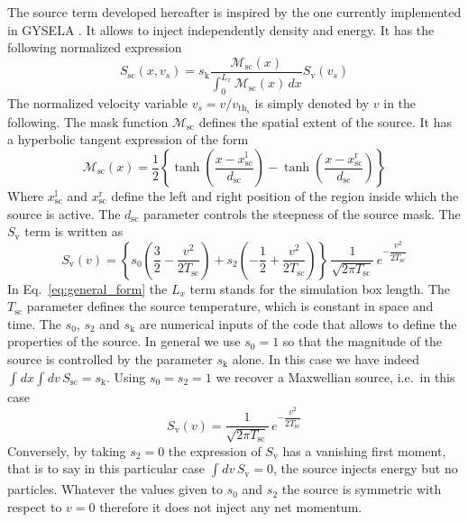 \documentclass[11pt]{article}
\begin{document}
The source term developed hereafter is inspired by the one currently implemented in GYSELA \cite[Appendix A]{Sarazin_2011}. It allows to inject independently density and energy. It has the following normalized expression
%
\begin{equation}\label{eq:general_form}
   S_\mathrm{sc}(x, v_s) = s_\mathrm{k} \dfrac{\mathcal{M}_\mathrm{sc}(x)}{\int_{0}^{L_x} \mathcal{M}_\mathrm{sc}(x) \, dx} S_\mathrm{v}(v_s) 
\end{equation}
%
The normalized velocity variable $v_s = v/v_{\mathrm{th}_s}$ is simply denoted by $v$ in the following. The mask function $\mathcal{M}_\mathrm{sc}$ defines the spatial extent of the source. It has a hyperbolic tangent expression of the form 
%
\begin{equation*}
  \mathcal{M}_\mathrm{sc}(x)  = \dfrac{1}{2}\left\{ \operatorname{tanh}{\left(\dfrac{x-x_\mathrm{sc}^\mathrm{l}}{d_\mathrm{sc}}\right)} - \operatorname{tanh}{\left(\dfrac{x-x_\mathrm{sc}^\mathrm{r}}{d_\mathrm{sc}}\right)}  \right\} 
\end{equation*}
%
Where $x_\mathrm{sc}^\mathrm{l}$ and $x_\mathrm{sc}^\mathrm{r}$ define the left and right position of the region inside which the source is active. The $d_\mathrm{sc}$ parameter controls the steepness of the source mask. The  $S_\mathrm{v}$ term is written as
%
\begin{equation}\label{eq:sv_expression}
  S_\mathrm{v}(v) = \left\{ s_0\left( \dfrac{3}{2} - \dfrac{v^2}{2 T_\mathrm{sc}} \right) + s_2 \left( -\dfrac{1}{2} + \dfrac{v^2}{2 T_\mathrm{sc}} \right)  \right\} \, \dfrac{1}{\sqrt{2 \pi  T_\mathrm{sc}} } \, e^{- \dfrac{v^2}{2 T_\mathrm{sc}}}
\end{equation}
%
In Eq.~\ref{eq:general_form} the $L_x$ term stands for the simulation box length. The $T_\mathrm{sc}$ parameter defines the source temperature, which is constant in space and time. The  $s_0$, $s_2$ and $s_\mathrm{k}$ are numerical inputs of the code that allows to define the properties of the source. In general we use $s_0 = 1$ so that the magnitude of the source is controlled by the parameter $s_\mathrm{k}$ alone. In this case we have indeed $\int_{}^{} d x \int_{}^{} dv \, S_\mathrm{sc} = s_\mathrm{k}$. Using $s_0 = s_2 = 1$ we recover a Maxwellian source, i.e.\ in this case 
%
\begin{equation}
  S_\mathrm{v}(v) = \dfrac{1}{\sqrt{2\pi T_\mathrm{sc}}} \, e^{- \dfrac{v^2}{2 T_\mathrm{sc}}}
\end{equation}
%
Conversely, by taking $s_2 = 0$ the expression of $S_\mathrm{v}$ has a vanishing first moment, that is to say in this particular case $\int_{}^{} dv\, S_\mathrm{v} = 0$, the source injects energy but no particles. Whatever the values given to $s_0$ and $s_2$ the source is symmetric with respect to $v=0$ therefore it does not inject any net momentum.
\end{document}
